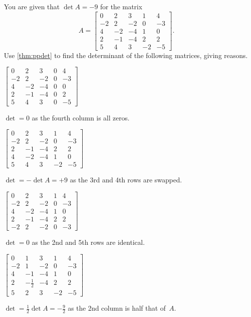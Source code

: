 \begin{example} 
You are given that \(\det A=-9\) for the matrix
\begin{equation*}
A=\begin{bmatrix}0&2&3&1&4
\\-2&2&-2&0&-3
\\4&-2&-4&1&0
\\2&-1&-4&2&2
\\5&4&3&-2&-5\end{bmatrix}.
\end{equation*}
Use \cref{thm:ppdet} to find the determinant of the following matrices, giving reasons. 
\begin{Parts}
\item \(\begin{bmatrix}0&2&3&0&4
\\-2&2&-2&0&-3
\\4&-2&-4&0&0
\\2&-1&-4&0&2
\\5&4&3&0&-5\end{bmatrix}\)
\begin{solution} 
\(\det=0\) as the fourth column is all zeros. 
\end{solution}

\item \(\begin{bmatrix}0&2&3&1&4
\\-2&2&-2&0&-3
\\2&-1&-4&2&2
\\4&-2&-4&1&0
\\5&4&3&-2&-5\end{bmatrix}\)
\begin{solution} 
\(\det=-\det A=+9\) as the 3rd and 4th rows are swapped. 
\end{solution}

\item \(\begin{bmatrix}0&2&3&1&4
\\-2&2&-2&0&-3
\\4&-2&-4&1&0
\\2&-1&-4&2&2
\\-2&2&-2&0&-3\end{bmatrix}\)
\begin{solution} 
\(\det=0\) as the 2nd and 5th rows are identical. 
\end{solution}

\item \(\begin{bmatrix}0&1&3&1&4
\\-2&1&-2&0&-3
\\4&-1&-4&1&0
\\2&-\frac12&-4&2&2
\\5&2&3&-2&-5\end{bmatrix}\)
\begin{solution} 
\(\det=\frac12\det A=-\frac92\) as the 2nd column is half that of~\(A\).
\end{solution}


\end{Parts}
\end{example}
